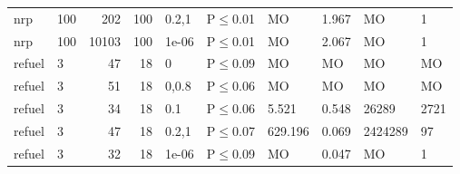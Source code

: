\begin{longtable}{llrrllllll}
 nrp           & 100      &    	202 & 100 & 0.2,1 & P$\leq$0.01  & MO      & 1.967   & MO      & 1      \\
 nrp           & 100      &  	10103 & 100 & 1e-06 & P$\leq$0.01  & MO      & 2.067   & MO      & 1      \\
 refuel        & 3        &     	47 &  18 & 0     & P$\leq$0.09  & MO      & MO      & MO      & MO     \\
 refuel        & 3        &     	51 &  18 & 0,0.8 & P$\leq$0.06  & MO      & MO      & MO      & MO     \\
 refuel        & 3        &     	34 &  18 & 0.1   & P$\leq$0.06  & 5.521   & 0.548   & 26289   & 2721   \\
 refuel        & 3        &     	47 &  18 & 0.2,1 & P$\leq$0.07  & 629.196 & 0.069   & 2424289 & 97     \\
 refuel        & 3        &     	32 &  18 & 1e-06 & P$\leq$0.09  & MO      & 0.047   & MO      & 1      \\
\bottomrule
\end{longtable}
